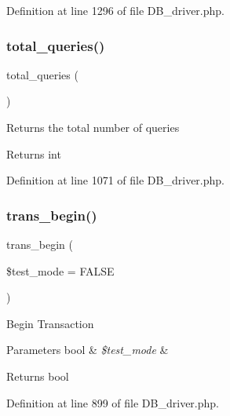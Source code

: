 Definition at line 1296 of file D\+B\+\_\+driver.\+php.

\mbox{\label{class_c_i___d_b__driver_a8fc0b6551e1ca0c68c6e3a66b27310fc}} 
\subsubsection{\texorpdfstring{total\_queries()}{total\_queries()}}
{\footnotesize\ttfamily total\+\_\+queries (\begin{DoxyParamCaption}{ }\end{DoxyParamCaption})}

Returns the total number of queries

\begin{DoxyReturn}{Returns}
int 
\end{DoxyReturn}


Definition at line 1071 of file D\+B\+\_\+driver.\+php.

\mbox{\label{class_c_i___d_b__driver_a90e153cf190d273336d77cce930587e1}} 
\subsubsection{\texorpdfstring{trans\_begin()}{trans\_begin()}}
{\footnotesize\ttfamily trans\+\_\+begin (\begin{DoxyParamCaption}\item[{}]{\$test\+\_\+mode = {\ttfamily FALSE} }\end{DoxyParamCaption})}

Begin Transaction


\begin{DoxyParams}[1]{Parameters}
bool & {\em \$test\+\_\+mode} & \\
\hline
\end{DoxyParams}
\begin{DoxyReturn}{Returns}
bool 
\end{DoxyReturn}


Definition at line 899 of file D\+B\+\_\+driver.\+php.

\mbox{\label{class_c_i___d_b__driver_af4fbdcdace4aa94a139b64877601fe9b}} 

